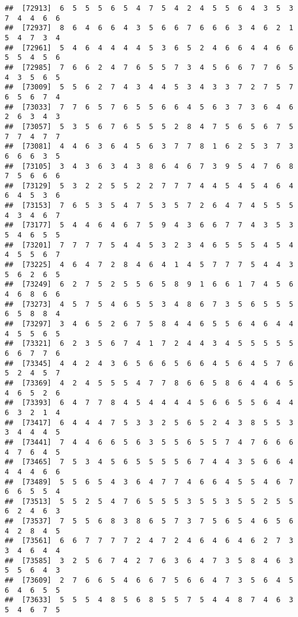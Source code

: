 \documentclass[
]{book}
\begin{document}
\begin{verbatim}
##  [72913]  6  5  5  5  6  5  4  7  5  4  2  4  5  5  6  4  3  5  3  7  4  4  6  6
##  [72937]  8  6  4  6  6  4  3  5  6  6  7  6  6  6  3  4  6  2  1  5  4  7  3  4
##  [72961]  5  4  6  4  4  4  4  5  3  6  5  2  4  6  6  4  4  6  6  5  5  4  5  6
##  [72985]  7  6  6  2  4  7  6  5  5  7  3  4  5  6  6  7  7  6  5  4  3  5  6  5
##  [73009]  5  5  6  2  7  4  3  4  4  5  3  4  3  3  7  2  7  5  7  6  5  6  7  4
##  [73033]  7  7  6  5  7  6  5  5  6  6  4  5  6  3  7  3  6  4  6  2  6  3  4  3
##  [73057]  5  3  5  6  7  6  5  5  5  2  8  4  7  5  6  5  6  7  5  7  7  4  7  7
##  [73081]  4  4  6  3  6  4  5  6  3  7  7  8  1  6  2  5  3  7  3  6  6  6  3  5
##  [73105]  3  4  3  6  3  4  3  8  6  4  6  7  3  9  5  4  7  6  8  7  5  6  6  6
##  [73129]  5  3  2  2  5  5  2  2  7  7  7  4  4  5  4  5  4  6  4  6  4  5  3  6
##  [73153]  7  6  5  3  5  4  7  5  3  5  7  2  6  4  7  4  5  5  5  4  3  4  6  7
##  [73177]  5  4  4  6  4  6  7  5  9  4  3  6  6  7  7  4  3  5  3  5  4  6  5  5
##  [73201]  7  7  7  7  5  4  4  5  3  2  3  4  6  5  5  5  4  5  4  4  5  5  6  7
##  [73225]  4  6  4  7  2  8  4  6  4  1  4  5  7  7  7  5  4  4  3  5  6  2  6  5
##  [73249]  6  2  7  5  2  5  5  6  5  8  9  1  6  6  1  7  4  5  6  4  6  8  6  6
##  [73273]  4  5  7  5  4  6  5  5  3  4  8  6  7  3  5  6  5  5  5  6  5  8  8  4
##  [73297]  3  4  6  5  2  6  7  5  8  4  4  6  5  5  6  4  6  4  4  4  5  5  6  5
##  [73321]  6  2  3  5  6  7  4  1  7  2  4  4  3  4  5  5  5  5  5  6  6  7  7  6
##  [73345]  4  4  2  4  3  6  5  6  6  5  6  6  4  5  6  4  5  7  6  5  2  4  5  7
##  [73369]  4  2  4  5  5  5  4  7  7  8  6  6  5  8  6  4  4  6  5  4  6  5  2  6
##  [73393]  6  4  7  7  8  4  5  4  4  4  4  5  6  6  5  5  6  4  4  6  3  2  1  4
##  [73417]  6  4  4  4  7  5  3  3  2  5  6  5  2  4  3  8  5  5  3  3  4  4  4  5
##  [73441]  7  4  4  6  6  5  6  3  5  5  6  5  5  7  4  7  6  6  6  4  7  6  4  5
##  [73465]  7  5  3  4  5  6  5  5  5  5  6  7  4  4  3  5  6  6  4  4  4  4  6  6
##  [73489]  5  5  6  5  4  3  6  4  7  7  4  6  6  4  5  5  4  6  7  6  6  5  5  4
##  [73513]  5  5  2  5  4  7  6  5  5  5  3  5  5  3  5  5  2  5  5  6  2  4  6  3
##  [73537]  7  5  5  6  8  3  8  6  5  7  3  7  5  6  5  4  6  5  6  4  2  8  4  5
##  [73561]  6  6  7  7  7  7  2  4  7  2  4  6  4  6  4  6  2  7  3  3  4  6  4  4
##  [73585]  3  2  5  6  7  4  2  7  6  3  6  4  7  3  5  8  4  6  3  5  5  6  4  3
##  [73609]  2  7  6  6  5  4  6  6  7  5  6  6  4  7  3  5  6  4  5  6  4  6  5  5
##  [73633]  5  5  5  4  8  5  6  8  5  5  7  5  4  4  8  7  4  6  3  5  4  6  7  5

\end{verbatim}
\end{document}
